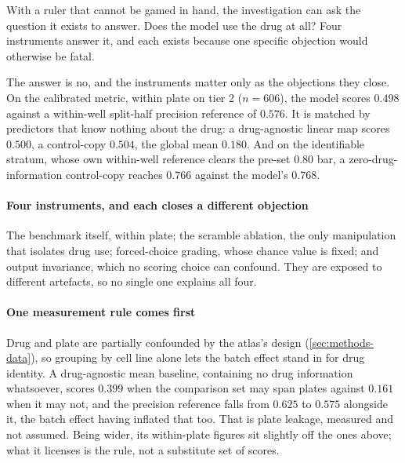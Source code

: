 
\label{sec:methods-controls}   %


\begin{question}[2]
With a ruler that cannot be gamed in hand, the investigation can ask the
question it exists to answer. Does the model use the drug at all? Four
instruments answer it, and each exists because one specific objection would
otherwise be fatal.
\end{question}

\noindent
The answer is no, and the instruments matter only as the objections they close.
On the calibrated metric, within plate on tier 2 ($n = \num{606}$), the model
scores $0.498$ against a within-well split-half precision reference of
$0.576$. It is matched by predictors that know
nothing about the drug: a drug-agnostic linear map scores $0.500$, a
control-copy $0.504$, the global mean $0.180$. And on the identifiable stratum,
whose own within-well reference clears the pre-set $0.80$ bar, a
zero-drug-information control-copy reaches $0.766$ against the model's $0.768$.

\paragraph{Four instruments, and each closes a different objection} The
benchmark itself, within plate; the scramble ablation, the only manipulation
that isolates drug use; forced-choice grading, whose chance value is fixed; and
output invariance, which no scoring choice can confound. They are exposed to
different artefacts, so no single one explains all four.

\paragraph{One measurement rule comes first} Drug and plate are partially
confounded by the atlas's design
(\cref{sec:methods-data}), so grouping by cell line alone lets the batch effect
stand in for drug identity. A drug-agnostic mean baseline, containing no drug
information whatsoever, scores $0.399$ when the comparison set may span plates
against $0.161$ when it may not, and the precision reference falls from $0.625$
to $0.575$ alongside it, the batch
effect having inflated that too. That is plate leakage, measured and not
assumed. Being wider, its within-plate figures sit slightly off the ones above;
what it licenses is the rule, not a substitute set of scores.

